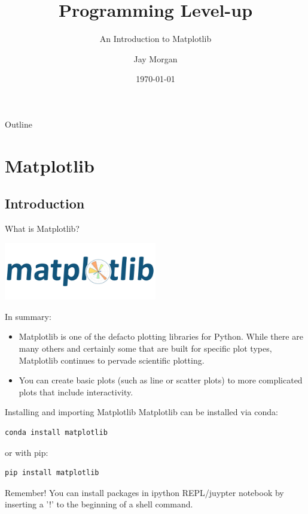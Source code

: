 \documentclass[10pt]{beamer}
\author{Jay Morgan}
\date{\today}
\title{Programming Level-up}
\subtitle{An Introduction to Matplotlib}
\begin{document}
\maketitle
\begin{frame}{Outline}
\tableofcontents
\end{frame}


\section{Matplotlib}
\label{sec:orgdd3e7a5}

\subsection{Introduction}
\label{sec:org6bd17a4}

\begin{frame}[label={sec:org8312476}]{What is Matplotlib?}
\begin{center}
\includegraphics[width=0.5\textwidth]{images/matlogo.png}
\end{center}

In summary:
\begin{itemize}
\item Matplotlib is one of the defacto plotting libraries for Python. While there
are many others and certainly some that are built for specific plot types,
Matplotlib continues to pervade scientific plotting.
\item You can create basic plots (such as line or scatter plots) to more complicated
plots that include interactivity.
\end{itemize}
\end{frame}

\begin{frame}[label={sec:org58e46c2},fragile]{Installing and importing Matplotlib}
 Matplotlib can be installed via conda:

\begin{verbatim}
conda install matplotlib
\end{verbatim}

or with pip:

\begin{verbatim}
pip install matplotlib
\end{verbatim}

Remember! You can install packages in ipython REPL/juypter notebook by
inserting a '!' to the beginning of a shell command.
\end{frame}
\end{document}
